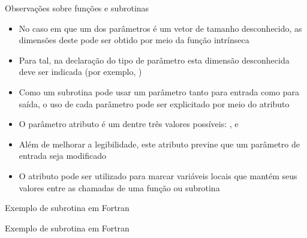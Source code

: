 \begin{frame}[fragile]{Observações sobre funções e subrotinas}

    \begin{itemize}
        \item No caso em que um dos parâmetros é um vetor  de tamanho 
            desconhecido, as dimensões deste pode ser obtido por meio da função intrínseca

        \item Para tal, na declaração do tipo de parâmetro esta dimensão desconhecida deve ser
            indicada (por exemplo, )

        \item Como um subrotina pode usar um parâmetro tanto para entrada como para saída, o uso
            de cada parâmetro pode ser explicitado por meio do atributo 

        \item O parâmetro atributo é um dentre três valores possíveis: ,
             e 

        \item Além de melhorar a legibilidade, este atributo previne que um parâmetro de entrada
            seja modificado

        \item O atributo  pode ser utilizado para marcar variáveis locais que
            mantém seus valores entre as chamadas de uma função ou subrotina 
    \end{itemize}

\end{frame}

\begin{frame}[fragile]{Exemplo de subrotina em Fortran}
\end{frame}

\begin{frame}[fragile]{Exemplo de subrotina em Fortran}
\end{frame}
